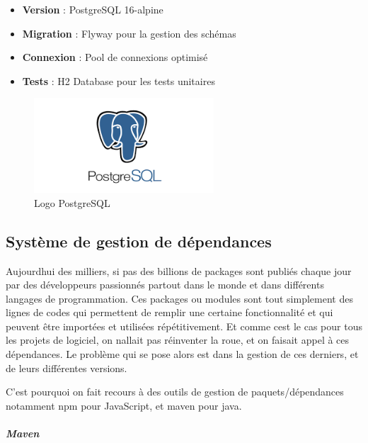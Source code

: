 \documentclass[12pt,a4paper,twoside]{report}
\begin{document}
\begin{itemize}
\item
  \textbf{Version} : PostgreSQL 16-alpine
\item
  \textbf{Migration} : Flyway pour la gestion des schémas
\item
  \textbf{Connexion} : Pool de connexions optimisé
\item
  \textbf{Tests} : H2 Database pour les tests unitaires
\end{itemize}

\begin{figure}[H]
\centering
\includegraphics[width=0.6\textwidth]{latex_media/media/image26.png}
\caption{Logo PostgreSQL}
\label{fig:logo-postgresql}
\end{figure}

\hypertarget{systuxe8me-de-gestion-de-duxe9pendances}{%
\subsection{Système de gestion de
dépendances}\label{systuxe8me-de-gestion-de-duxe9pendances}}

Aujourd\textquotesingle hui des milliers, si pas des billions de
packages sont publiés chaque jour par des développeurs passionnés
partout dans le monde et dans différents langages de programmation. Ces
packages ou modules sont tout simplement des lignes de codes qui
permettent de remplir une certaine fonctionnalité et qui peuvent être
importées et utilisées répétitivement. Et comme c\textquotesingle est le
cas pour tous les projets de logiciel, on n\textquotesingle allait pas
réinventer la roue, et on faisait appel à ces dépendances. Le problème
qui se pose alors est dans la gestion de ces derniers, et de leurs
différentes versions.

C'est pourquoi on fait recours à des outils de gestion de
paquets/dépendances notamment npm pour JavaScript, et maven pour java.~

\hypertarget{maven}{%
\subparagraph{\texorpdfstring{\textbf{Maven}}{Maven}}\label{maven}}
\end{document}
